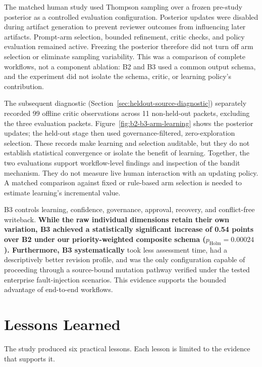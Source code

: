 \documentclass[manuscript,review]{acmart}
\begin{document}
The matched human study used Thompson sampling over a frozen pre-study posterior as a controlled evaluation configuration. Posterior updates were disabled during artifact generation to prevent reviewer outcomes from influencing later artifacts. Prompt-arm selection, bounded refinement, critic checks, and policy evaluation remained active. Freezing the posterior therefore did not turn off arm selection or eliminate sampling variability. This was a comparison of complete workflows, not a component ablation: B2 and B3 used a common output schema, and the experiment did not isolate the schema, critic, or learning policy's contribution.

The subsequent diagnostic (Section~\ref{sec:heldout-source-diagnostic}) separately recorded 99 offline critic observations across 11 non-held-out packets, excluding the three evaluation packets. Figure~\ref{fig:b2-b3-arm-learning} shows the posterior updates; the held-out stage then used governance-filtered, zero-exploration selection. These records make learning and selection auditable, but they do not establish statistical convergence or isolate the benefit of learning. Together, the two evaluations support workflow-level findings and inspection of the bandit mechanism. They do not measure live human interaction with an updating policy. A matched comparison against fixed or rule-based arm selection is needed to estimate learning's incremental value.

B3 controls learning, confidence, governance, approval, recovery, and conflict-free writeback. \textbf{While the raw individual dimensions retain their own variation, B3 achieved a statistically significant increase of 0.54 points over B2 under our priority-weighted composite schema ($p_{\mathrm{Holm}}=0.00024$). Furthermore, B3 systematically} took less assessment time, had a descriptively better revision profile, and was the only configuration capable of proceeding through a source-bound mutation pathway verified under the tested enterprise fault-injection scenarios. This evidence supports the bounded advantage of end-to-end workflows.

\section{Lessons Learned}\label{sec:lessons}

The study produced six practical lessons. Each lesson is limited to the evidence that supports it.
\end{document}
